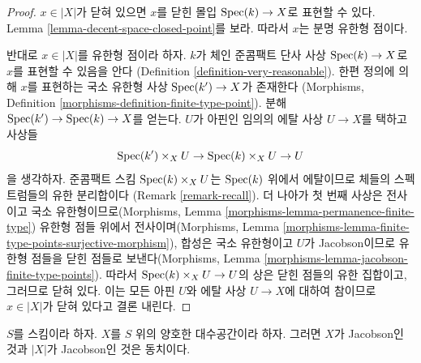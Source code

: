 \begin{proof}
$x \in |X|$가 닫혀 있으면 $x$를 닫힌 몰입
$\mathop{\mathrm{Spec}}(k) \to X$로 표현할 수 있다. Lemma
\ref{lemma-decent-space-closed-point}를 보라. 따라서 $x$는 분명
유한형 점이다.

\medskip\noindent
반대로 $x \in |X|$를 유한형 점이라 하자. $k$가 체인 준콤팩트 단사
사상 $\mathop{\mathrm{Spec}}(k) \to X$로 $x$를 표현할 수 있음을 안다
(Definition \ref{definition-very-reasonable}). 한편 정의에 의해
$x$를 표현하는 국소 유한형 사상 $\mathop{\mathrm{Spec}}(k') \to X$가 존재한다
(Morphisms, Definition \ref{morphisms-definition-finite-type-point}).
분해 $\mathop{\mathrm{Spec}}(k') \to \mathop{\mathrm{Spec}}(k) \to X$를 얻는다.
$U$가 아핀인 임의의 에탈 사상 $U \to X$를 택하고 사상들
$$
\mathop{\mathrm{Spec}}(k') \times_X U \to \mathop{\mathrm{Spec}}(k) \times_X U \to U
$$
을 생각하자. 준콤팩트 스킴 $\mathop{\mathrm{Spec}}(k) \times_X U$는
$\mathop{\mathrm{Spec}}(k)$ 위에서 에탈이므로 체들의 스펙트럼들의 유한 분리합이다
(Remark \ref{remark-recall}). 더 나아가 첫 번째 사상은 전사이고
국소 유한형이므로(Morphisms, Lemma
\ref{morphisms-lemma-permanence-finite-type}) 유한형 점들 위에서
전사이며(Morphisms, Lemma
\ref{morphisms-lemma-finite-type-points-surjective-morphism}),
합성은 국소 유한형이고 $U$가 Jacobson이므로 유한형 점들을 닫힌
점들로 보낸다(Morphisms, Lemma
\ref{morphisms-lemma-jacobson-finite-type-points}).
따라서 $\mathop{\mathrm{Spec}}(k) \times_X U \to U$의 상은 닫힌 점들의 유한 집합이고,
그러므로 닫혀 있다. 이는 모든 아핀 $U$와 에탈 사상 $U \to X$에
대하여 참이므로 $x \in |X|$가 닫혀 있다고 결론 내린다.
\end{proof}

\begin{lemma}
\label{lemma-decent-Jacobson}
$S$를 스킴이라 하자. $X$를 $S$ 위의 양호한 대수공간이라 하자.
그러면 $X$가 Jacobson인 것과 $|X|$가 Jacobson인 것은 동치이다.
\end{lemma}


